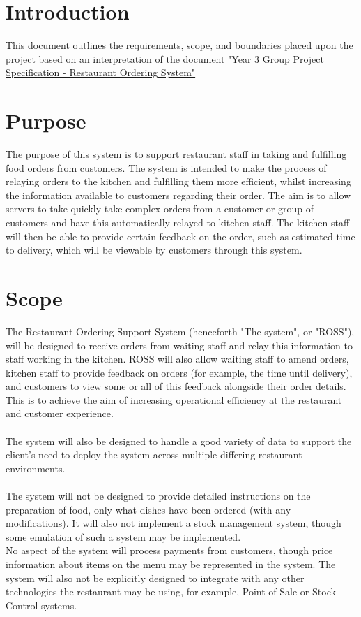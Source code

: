 \documentclass[11pt, a4paper]{report}
\begin{document}
\nocite{*}

\pagebreak
\minitoc
\pagebreak

\section{Introduction} \label{sec:Intro}

This document outlines the requirements, scope, and boundaries placed upon the project based on an interpretation of the document \href{http://www.macs.hw.ac.uk/~rpp6/teaching/GroupProject/docs/project/GroupProjectSpec2017.pdf}{"Year 3 Group Project Specification - Restaurant Ordering System"}

\section{Purpose} \label{sec:purpose}

The purpose of this system is to support restaurant staff in taking and fulfilling food orders from customers. The system is intended to make the process of relaying orders to the kitchen and fulfilling them more efficient, whilst increasing the information available to customers regarding their order. The aim is to allow servers to take quickly take complex orders from a customer or group of customers and have this automatically relayed to kitchen staff. The kitchen staff will then be able to provide certain feedback on the order, such as estimated time to delivery, which will be viewable by customers through this system.

\section{Scope} \label{sec:Scope}
The Restaurant Ordering Support System (henceforth "The system", or "ROSS"), will be designed to receive orders from waiting staff and relay this information to staff working in the kitchen. ROSS will also allow waiting staff to amend orders, kitchen staff to provide feedback on orders (for example, the time until delivery), and customers to view some or all of this feedback alongside their order details. This is to achieve the aim of increasing operational efficiency at the restaurant and customer experience.\\
\\
The system will also be designed to handle a good variety of data to support the client's need to deploy the system across multiple differing restaurant environments.\\
\\
The system will not be designed to provide detailed instructions on the preparation of food, only what dishes have been ordered (with any modifications). It will also not implement a stock management system, though some emulation of such a system may be implemented.\\
No aspect of the system will process payments from customers, though price information about items on the menu may be represented in the system. The system will also not be explicitly designed to integrate with any other technologies the restaurant may be using, for example, Point of Sale or Stock Control systems.
\end{document}
